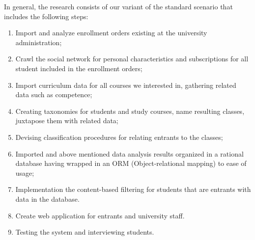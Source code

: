\documentclass[conference]{IEEEtran}
\begin{document}

In general, the research consists of our variant of the standard scenario that includes the following steps:
\begin{enumerate}
\item Import and analyze enrollment orders existing at the university administration;
\item Crawl the social network for personal characteristics and subscriptions for all student included in the enrollment orders;
\item Import curriculum data for all courses we interested in, gathering related data such as competence;
\item Creating taxonomies for students and study courses, name resulting classes, juxtapose them with related data;
\item Devising classification procedures for relating entrants to the classes;
\item Imported and above mentioned data analysis results organized in a rational database having wrapped in an ORM (Object-relational mapping) to ease of usage;
\item Implementation the content-based filtering for students that are entrants with data in the database.
\item Create web application for entrants and university staff.
\item Testing the system and interviewing students.
\end{enumerate}
\end{document}
